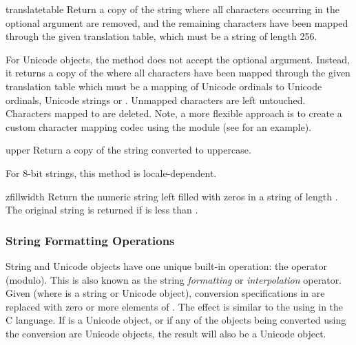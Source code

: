 \begin{methoddesc}[string]{translate}{table}
Return a copy of the string where all characters occurring in the
optional argument  are removed, and the remaining
characters have been mapped through the given translation table, which
must be a string of length 256.

For Unicode objects, the  method does not
accept the optional  argument.  Instead, it
returns a copy of the  where all characters have been mapped
through the given translation table which must be a mapping of
Unicode ordinals to Unicode ordinals, Unicode strings or .
Unmapped characters are left untouched. Characters mapped to 
are deleted.  Note, a more flexible approach is to create a custom
character mapping codec using the  module (see
 for an example).      
\end{methoddesc}

\begin{methoddesc}[string]{upper}{}
Return a copy of the string converted to uppercase.

For 8-bit strings, this method is locale-dependent.
\end{methoddesc}

\begin{methoddesc}[string]{zfill}{width}
Return the numeric string left filled with zeros in a string
of length . The original string is returned if
 is less than .
\end{methoddesc}


\subsubsection{String Formatting Operations \label{typesseq-strings}}


String and Unicode objects have one unique built-in operation: the
\code{\%} operator (modulo).  This is also known as the string
\emph{formatting} or \emph{interpolation} operator.  Given
 (where  is a string or
Unicode object), \code{\%} conversion specifications in 
are replaced with zero or more elements of .  The effect
is similar to the using  in the C language.  If
 is a Unicode object, or if any of the objects being
converted using the  conversion are Unicode objects, the
result will also be a Unicode object.

